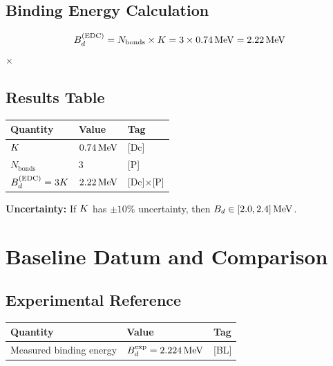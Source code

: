 \subsection{Binding Energy Calculation}

\begin{derivationbox}[title=Binding Energy Result]
    \begin{equation}
        B_d^{\text{(EDC)}} = N_{\text{bonds}} \times K = 3 \times 0.74\,\mathrm{MeV} = 2.22\,\mathrm{MeV}
        \label{eq:Bd_result}
    \end{equation}
    \tagDc $\times$ \tagP
\end{derivationbox}

\subsection{Results Table}

\begin{center}
\begin{tabular}{lll}
\toprule
\textbf{Quantity} & \textbf{Value} & \textbf{Tag} \\
\midrule
$K$ & $0.74\,\mathrm{MeV}$ & [Dc] \\
$N_{\text{bonds}}$ & $3$ & [P] \\
$B_d^{\text{(EDC)}} = 3K$ & $2.22\,\mathrm{MeV}$ & [Dc]$\times$[P] \\
\bottomrule
\end{tabular}
\end{center}

\textbf{Uncertainty:} If $K$ has $\pm 10\%$ uncertainty, then
$B_d \in [2.0, 2.4]\,\mathrm{MeV}$.

\section{Baseline Datum and Comparison}
\label{sec:d:baseline}

\subsection{Experimental Reference}

\begin{center}
\begin{tabular}{lll}
\toprule
\textbf{Quantity} & \textbf{Value} & \textbf{Tag} \\
\midrule
Measured binding energy & $B_d^{\text{exp}} = 2.224\,\mathrm{MeV}$ & [BL] \\
\bottomrule
\end{tabular}
\end{center}

